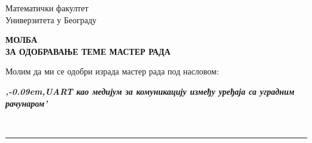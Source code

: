 \documentclass[a4paper]{article}
\def\zn{,\kern-0.09em,}
\begin{document}
\thispagestyle{empty}

\begin{flushleft}
Математички факултет\\
Универзитета у Београду
\end{flushleft}

\bigskip

\begin{center}
\textbf{МОЛБА\\
ЗА ОДОБРАВАЊЕ ТЕМЕ МАСТЕР РАДА
}\end{center}

\bigskip

\begin{flushleft}
Молим да ми се одобри израда мастер рада под насловом:
\end{flushleft}

\begin{minipage}{16.5cm}
\textbf{\textit{\zn UART као медијум за комуникацију између уређаја са уградним рачунаром'}}
\end{minipage}\\
\rule[4mm]{17.5cm}{.05mm}
\end{document}
